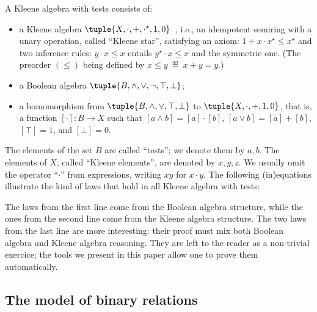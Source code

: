 \documentclass[a4paper]{llncs}
\newif\iflong\longfalse
\begin{document}
A Kleene algebra with tests consists of:
\begin{itemize}
\item a Kleene algebra
  $\tuple{X,{\cdot},{+},{\cdot^\star},1,0}$~\cite{kozen94:ka:completeness},
  i.e., an idempotent semiring with a unary operation, called ``Kleene
  star'', satisfying an axiom: $1+x\cdot{}x^\star \le x^\star$ and two
  inference rules: $y\cdot{}x \le x$ entails $y^\star\cdot{}x \le x$
  and the symmetric one.  (The preorder $(\le)$ being defined by $x\le y
  ~ \eqdef ~ x+y = y$.)
\item a Boolean algebra $\tuple{B,{\land},{\lor},{\neg},\top,\bot}$;
\item a homomorphism from $\tuple{B,{\land},{\lor},\top,\bot}$ to
  $\tuple{X,{\cdot},{+},1,0}$, that is, a function $[\cdot]:B\to X$
  such that $[a\land b]=[a]\cdot[b]$, $[a\lor b]=[a]+[b]$, $[\top]=1$,
  and $[\bot]=0$.
\end{itemize}
\iflong
(Kozen actually uses a slightly different
definition~\cite{kozen:97:kat}, where $B$ is a subset of $X$, and the
homomorphism is the identity map. While this yields to a more concise
syntax for paper proofs, it is more natural and easier in Coq to use
types to distinguish the two sorts $B$ and $X$.)
\fi
The elements of the set $B$ are called ``tests''; we denote them by
$a,b$. The elements of $X$, called ``Kleene elements'', are denoted by
$x,y,z$. We usually omit the operator ``$\cdot$'' from expressions,
writing $xy$ for $x\cdot y$. The following (in)equations illustrate the
kind of laws that hold in all Kleene algebra with tests:
The laws from the first line come from the Boolean algebra structure,
while the ones from the second line come from the Kleene algebra
structure. The two laws from the last line are more interesting: their
proof must mix both Boolean algebra and Kleene algebra
reasoning. They are left to the reader as a non-trivial exercice; the
tools we present in this paper allow one to prove them automatically.

\subsection{The model of binary relations}
\label{ssec:rel:model}
\end{document}
